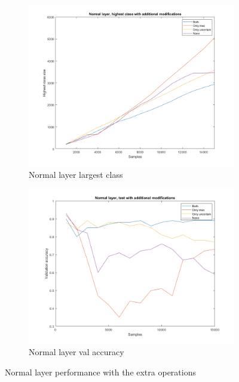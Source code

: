 \begin{figure}
    \centering
    \begin{subfigure}[b]{.45\textwidth}
        \centering
        \includegraphics[width=\textwidth]{figures/normalhigh.png}
        \caption{Normal layer largest class}
        \label{sfig:ex:extra:normalhigh}
    \end{subfigure}
    \hfill
    \begin{subfigure}[b]{.45\textwidth}
        \centering
        \includegraphics[width=\textwidth]{figures/normalva.png}
        \caption{Normal layer val accuracy}
        \label{sfig:ex:extra:normalva}
    \end{subfigure}
    \caption{Normal layer performance with the extra operations}
    \label{fig:ex:extra:normal}
\end{figure}


